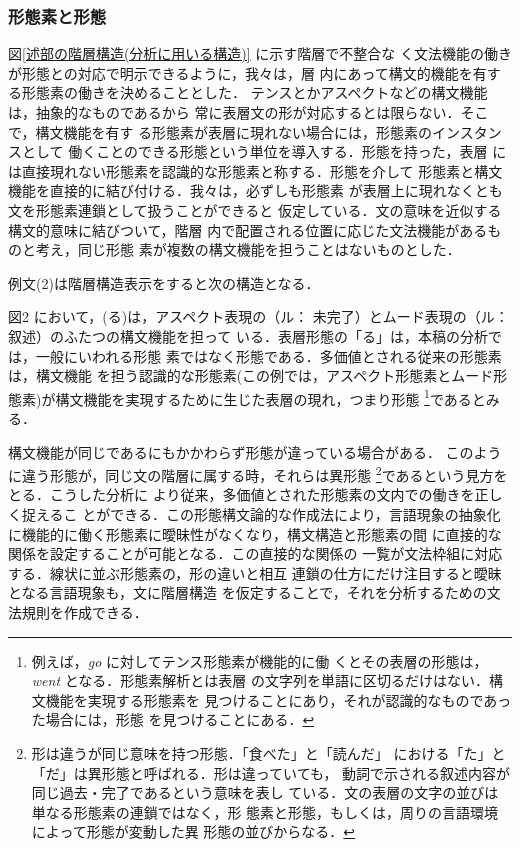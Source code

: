 \vspace*{-1mm}
\subsubsection{形態素と形態}
\label{形態素と形態}

\vspace*{-2mm}
図\ref{述部の階層構造(分析に用いる構造)} に示す階層で不整合な
く文法機能の働きが形態との対応で明示できるように，我々は，層
内にあって構文的機能を有する形態素の働きを決めることとした．
テンスとかアスペクトなどの構文機能は，抽象的なものであるから
常に表層文の形が対応するとは限らない．そこで，構文機能を有す
る形態素が表層に現れない場合には，形態素のインスタンスとして
働くことのできる形態という単位を導入する．形態を持った，表層
には直接現れない形態素を認識的な形態素と称する．形態を介して
形態素と構文機能を直接的に結び付ける．我々は，必ずしも形態素
が表層上に現れなくとも文を形態素連鎖として扱うことができると
仮定している．文の意味を近似する構文的意味に結びついて，階層
内で配置される位置に応じた文法機能があるものと考え，同じ形態
素が複数の構文機能を担うことはないものとした．

例文(2)は階層構造表示をすると次の構造となる．

\vspace*{-1.5mm}
\begin{center}
  
  \vspace*{-2.5mm}
\end{center}

図2 において，(る)は，アスペクト表現の（ル：
未完了）とムード表現の（ル：叙述）のふたつの構文機能を担って
いる．表層形態の「る」は，本稿の分析では，一般にいわれる形態
素ではなく形態である．多価値とされる従来の形態素は，構文機能
を担う認識的な形態素(この例では，アスペクト形態素とムード形
態素)が構文機能を実現するために生じた表層の現れ，つまり形態
\footnote{例えば，{\em go} に対してテンス形態素が機能的に働
くとその表層の形態は，{\em went} となる．形態素解析とは表層
の文字列を単語に区切るだけはない．構文機能を実現する形態素を
見つけることにあり，それが認識的なものであった場合には，形態
を見つけることにある．}であるとみる．

構文機能が同じであるにもかかわらず形態が違っている場合がある．
このように違う形態が，同じ文の階層に属する時，それらは異形態
\footnote{形は違うが同じ意味を持つ形態．「食べた」と「読んだ」
における「た」と「だ」は異形態と呼ばれる．形は違っていても，
動詞で示される叙述内容が同じ過去・完了であるという意味を表し
ている．文の表層の文字の並びは単なる形態素の連鎖ではなく，形
態素と形態，もしくは，周りの言語環境によって形態が変動した異
形態の並びからなる．}であるという見方をとる．こうした分析に
より従来，多価値とされた形態素の文内での働きを正しく捉えるこ
とができる．この形態構文論的な作成法により，言語現象の抽象化
に機能的に働く形態素に曖昧性がなくなり，構文構造と形態素の間
に直接的な関係を設定することが可能となる．この直接的な関係の
一覧が文法枠組に対応する．線状に並ぶ形態素の，形の違いと相互
連鎖の仕方にだけ注目すると曖昧となる言語現象も，文に階層構造
を仮定することで，それを分析するための文法規則を作成できる．


